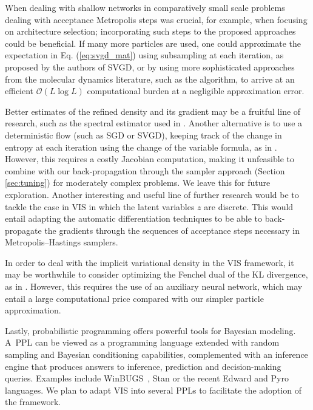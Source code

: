 When dealing with shallow networks in comparatively small scale problems
\parencite{muller1998issues} dealing with acceptance Metropolis steps was crucial, for example,
when focusing on architecture selection; incorporating such steps
to the proposed approaches could be beneficial. 
If many more particles are  used, one could approximate the expectation in Eq.  (\ref{eq:svgd_mat}) using subsampling at each iteration, as proposed by the authors of SVGD, or by using more sophisticated approaches from the molecular dynamics literature, such as the \textcite{barnes1986hierarchical} algorithm, to arrive at an efficient $\mathcal{O}(L \log L)$ computational burden at a negligible approximation error.

Better estimates of the refined density and its gradient may be a fruitful line of research, such as the spectral estimator used in \textcite{shi2018spectral}. Another alternative is to use a deterministic flow (such as SGD or SVGD), keeping
track of the change in entropy at each iteration using the change of the variable formula, as in \textcite{duvenaud2016early}. However, this requires a costly Jacobian computation, making it unfeasible to combine with our  back-propagation through the sampler approach (Section \ref{sec:tuning}) for moderately complex problems. We leave this for future exploration. {Another interesting and useful line of further research would be to tackle the case in VIS in which the latent variables $z$ are discrete. This would entail adapting the automatic differentiation techniques to be able to back-propagate the gradients through the sequences of acceptance steps necessary in Metropolis--Hastings samplers.}

In order to deal with the implicit variational density in the VIS framework, it may be worthwhile to consider optimizing the Fenchel dual of the KL divergence, as
 in \parencite{fang2019implicit}. However, this requires the use of an auxiliary neural network, which may entail a large computational price compared with our simpler particle approximation.

Lastly, probabilistic programming offers powerful tools for Bayesian modeling.
A~PPL can be viewed as a programming language extended with random sampling and Bayesian conditioning capabilities, complemented with an inference engine that produces answers to inference, prediction and decision-making queries. Examples 
include WinBUGS~\parencite{lunn2000winbugs}, Stan \parencite{carpenter2017stan} or the recent Edward \parencite{tran2018simple} and Pyro \parencite{bingham2018pyro} languages. We plan to adapt VIS into several PPLs to facilitate the adoption of the framework.

